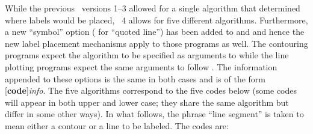 While the previous \GMT\ versions 1--3 allowed for a single algorithm that
determined where labels would be placed, \GMT\ 4 allows for five different
algorithms.  Furthermore, a new ``symbol'' option ( for ``quoted line'')
has been added to  and  and hence the new label
placement mechanisms apply to those programs as well.  The contouring programs
expect the algorithm to be specified as arguments to  while the line plotting
programs expect the same arguments to follow .  The information appended
to these options is the same in both cases and is of the form [{\bf code}]{\it info}.
The five algorithms correspond to the five codes below (some codes will appear in both
upper and lower case; they share the same algorithm but differ in some other ways).
In what follows, the phrase ``line segment'' is taken to mean either a contour or a line
to be labeled.  The codes are:

